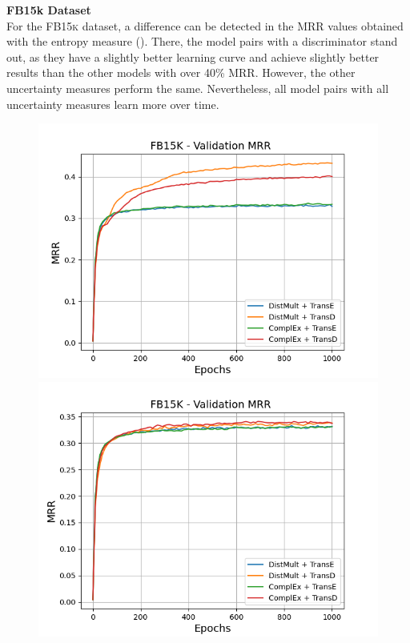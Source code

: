 \textbf{FB15k Dataset}
\label{subsubsec:metrics_fb15k}\\
%
For the \textsc{FB15k} dataset, a difference can be detected in the MRR values obtained with the entropy measure ().
There, the model pairs with a \transd discriminator stand out, as they have a slightly better learning curve and achieve slightly better results than the other models with over 40\% MRR.
However, the other uncertainty measures perform the same.
Nevertheless, all model pairs with all uncertainty measures learn more over time.
\begin{figure}[H]
    \centering
    \begin{minipage}{.5\textwidth}
      \centering
      \includegraphics[width=0.9\linewidth]{figures/results/gan_train/not_pretrained/uncertainty/max_distribution/entropy/fb15k/1k_epochs/uncertainty_fb15k_mrrs.png}
    \end{minipage}%
    \begin{minipage}{.5\textwidth}
      \centering
      \includegraphics[width=0.9\linewidth]{figures/results/gan_train/not_pretrained/uncertainty/max_distribution/least_confidence/fb15k/uncertainty_fb15k_mrrs.png}

\end{minipage}
\end{figure}
